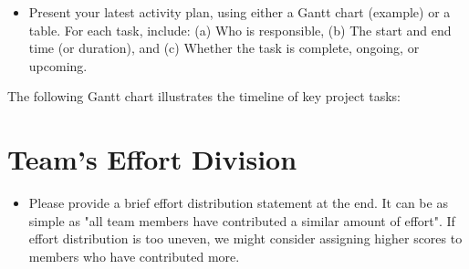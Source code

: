 \documentclass{article}
\begin{document}
\begin{itemize}
\item  Present your latest activity plan, using either a Gantt chart (example) or a table. For each task, include: (a) Who is responsible, (b) The start and end time (or duration), and (c) Whether the task is complete, ongoing, or upcoming. 
\end{itemize}

The following Gantt chart illustrates the timeline of key project tasks:




\section{Team's Effort Division}

\begin{itemize}
\item Please provide a brief effort distribution statement at the end. It can be as simple as "all team members have contributed a similar amount of effort". If effort distribution is too uneven, we might consider assigning higher scores to members who have contributed more.
\end{itemize}

\nocite{*}


\end{document}
